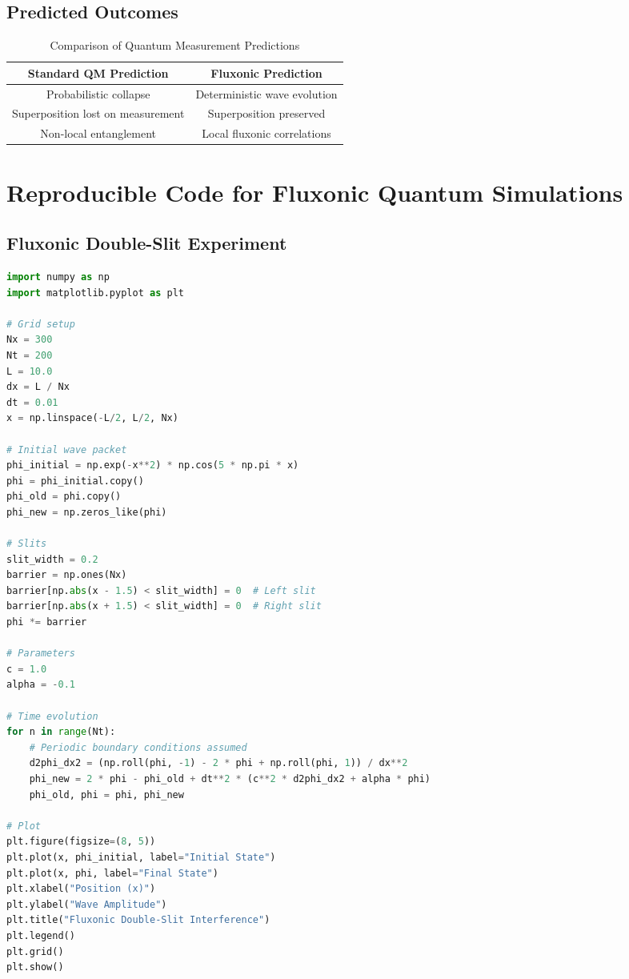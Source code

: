 \documentclass{article}
\begin{document}
\subsection{Predicted Outcomes}
\begin{table}[h]
    \centering
    \begin{tabular}{|c|c|}
        \hline
        \textbf{Standard QM Prediction} & \textbf{Fluxonic Prediction} \\
        \hline
        Probabilistic collapse & Deterministic wave evolution \\
        Superposition lost on measurement & Superposition preserved \\
        Non-local entanglement & Local fluxonic correlations \\
        \hline
    \end{tabular}
    \caption{Comparison of Quantum Measurement Predictions}
    \label{tab:predictions}
\end{table}

\section{Reproducible Code for Fluxonic Quantum Simulations}
\subsection{Fluxonic Double-Slit Experiment}
\begin{lstlisting}[language=Python, caption=Fluxonic Double-Slit Experiment, label=lst:doubleslit]
import numpy as np
import matplotlib.pyplot as plt

# Grid setup
Nx = 300
Nt = 200
L = 10.0
dx = L / Nx
dt = 0.01
x = np.linspace(-L/2, L/2, Nx)

# Initial wave packet
phi_initial = np.exp(-x**2) * np.cos(5 * np.pi * x)
phi = phi_initial.copy()
phi_old = phi.copy()
phi_new = np.zeros_like(phi)

# Slits
slit_width = 0.2
barrier = np.ones(Nx)
barrier[np.abs(x - 1.5) < slit_width] = 0  # Left slit
barrier[np.abs(x + 1.5) < slit_width] = 0  # Right slit
phi *= barrier

# Parameters
c = 1.0
alpha = -0.1

# Time evolution
for n in range(Nt):
    # Periodic boundary conditions assumed
    d2phi_dx2 = (np.roll(phi, -1) - 2 * phi + np.roll(phi, 1)) / dx**2
    phi_new = 2 * phi - phi_old + dt**2 * (c**2 * d2phi_dx2 + alpha * phi)
    phi_old, phi = phi, phi_new

# Plot
plt.figure(figsize=(8, 5))
plt.plot(x, phi_initial, label="Initial State")
plt.plot(x, phi, label="Final State")
plt.xlabel("Position (x)")
plt.ylabel("Wave Amplitude")
plt.title("Fluxonic Double-Slit Interference")
plt.legend()
plt.grid()
plt.show()
\end{lstlisting}
\end{document}
